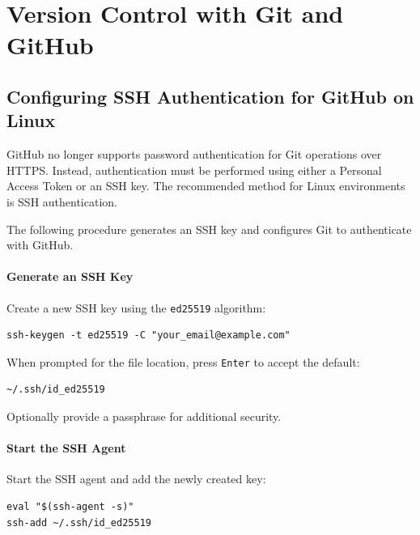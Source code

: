\chapter{Version Control with Git and GitHub}
\label{ch:git}

\section{Configuring SSH Authentication for GitHub on Linux}
GitHub no longer supports password authentication for Git operations over HTTPS. 
Instead, authentication must be performed using either a Personal Access Token or 
an SSH key. The recommended method for Linux environments is SSH authentication.

The following procedure generates an SSH key and configures Git to authenticate
with GitHub.

\subsubsection{Generate an SSH Key}

Create a new SSH key using the \texttt{ed25519} algorithm:

\begin{lstlisting}[basicstyle=\footnotesize\ttfamily]
ssh-keygen -t ed25519 -C "your_email@example.com"
\end{lstlisting}

When prompted for the file location, press \texttt{Enter} to accept the default:

\begin{lstlisting}[basicstyle=\footnotesize\ttfamily]
~/.ssh/id_ed25519
\end{lstlisting}

Optionally provide a passphrase for additional security.

\subsubsection{Start the SSH Agent}

Start the SSH agent and add the newly created key:

\begin{lstlisting}[basicstyle=\footnotesize\ttfamily]
eval "$(ssh-agent -s)"
ssh-add ~/.ssh/id_ed25519
\end{lstlisting}

